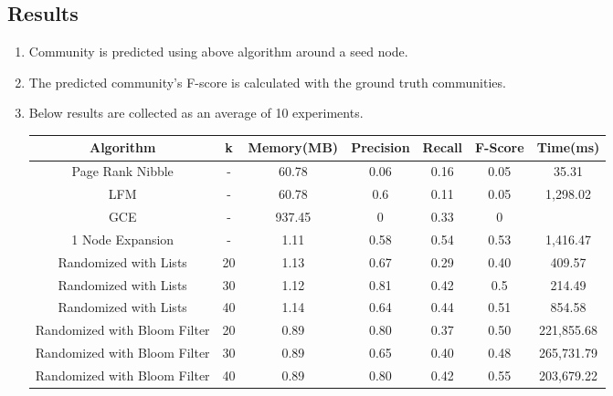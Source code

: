 \documentclass[a4paper]{article}
\begin{document}
\subsection{Results}
\begin{enumerate}
 \item Community is predicted using above algorithm around a seed node.
 \item The predicted community's F-score is calculated with the ground truth communities.
 \item Below results are collected as an average of 10 experiments.
 
 


\begin{center}
 \begin{tabular}{||c c c c c c c||} 
 \hline
 Algorithm & k & Memory(MB) & Precision & Recall & F-Score & Time(ms)\\ [0.4ex] 
 \hline\hline
 
 Page Rank Nibble & - & 60.78 & 0.06 & 0.16 & 0.05  & 35.31\\ 
 \hline
 LFM & - & 60.78 & 0.6 & 0.11 & 0.05 & 1,298.02\\ 
 \hline
 GCE & - & 937.45 & 0 & 0.33 & 0 & \\ 
 \hline
 1 Node Expansion & - & 1.11 &0.58 & 0.54 & 0.53 & 1,416.47\\
 \hline
 Randomized with Lists & 20 & 1.13 & 0.67 & 0.29 & 0.40  & 409.57\\
 \hline
 Randomized with Lists & 30 & 1.12 & 0.81 & 0.42 & 0.5 & 214.49 \\
 \hline
 Randomized with Lists & 40 & 1.14 & 0.64 & 0.44 & 0.51  & 854.58 \\  
 \hline
 Randomized with Bloom Filter & 20 & 0.89 & 0.80 & 0.37 & 0.50 & 221,855.68\\  
 \hline
 Randomized with Bloom Filter & 30 & 0.89 & 0.65 & 0.40 & 0.48  & 265,731.79\\  
 \hline
 Randomized with Bloom Filter & 40 & 0.89 & 0.80 & 0.42 & 0.55  & 203,679.22\\  
 \hline
\end{tabular}
\end{center}






\end{enumerate}
\end{document}
